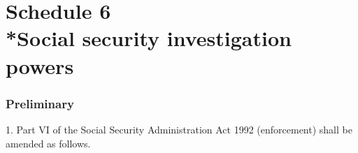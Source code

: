 \documentclass[12pt,a4paper]{article}
\begin{document}

\part[Schedule 6 --- Social security investigation powers]{Schedule 6\\*Social security investigation powers}

\renewcommand\parthead{--- Schedule 6}

\section*{Preliminary}

1. Part VI of the Social Security Administration Act 1992 (enforcement) shall be amended as follows.

\end{document}
